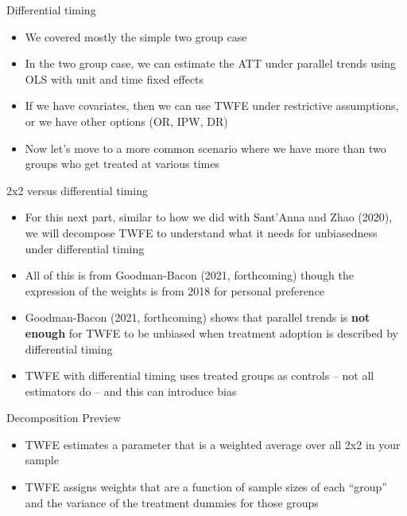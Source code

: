 \documentclass{beamer}
\begin{document}
\begin{frame}{Differential timing}

\begin{itemize}
\item We covered mostly the simple two group case
\item In the two group case, we can estimate the ATT under parallel trends using OLS with unit and time fixed effects
\item If we have covariates, then we can use TWFE under restrictive assumptions, or we have other options (OR, IPW, DR)
\item Now let's move to a more common scenario where we have more than two groups who get treated at various times
\end{itemize}

\end{frame}

\begin{frame}{2x2 versus differential timing}

\begin{itemize}
	\item For this next part, similar to how we did with Sant'Anna and Zhao (2020), we will decompose TWFE to understand what it needs for unbiasedness under differential timing
	\item All of this is from Goodman-Bacon (2021, forthcoming) though the expression of the weights is from 2018 for personal preference
	\item Goodman-Bacon (2021, forthcoming) shows that parallel trends is \textbf{not enough} for TWFE to be unbiased when treatment adoption is described by differential timing
	\item TWFE with differential timing uses treated groups as controls -- not all estimators do -- and this can introduce bias
\end{itemize}

\end{frame}



\begin{frame}{Decomposition Preview}

\begin{itemize}
\item TWFE estimates a parameter that is a weighted average over all 2x2 in your sample
\item TWFE assigns weights that are a function of sample sizes of each ``group'' and the variance of the treatment dummies for those groups
\end{itemize}

\end{frame}
\end{document}
